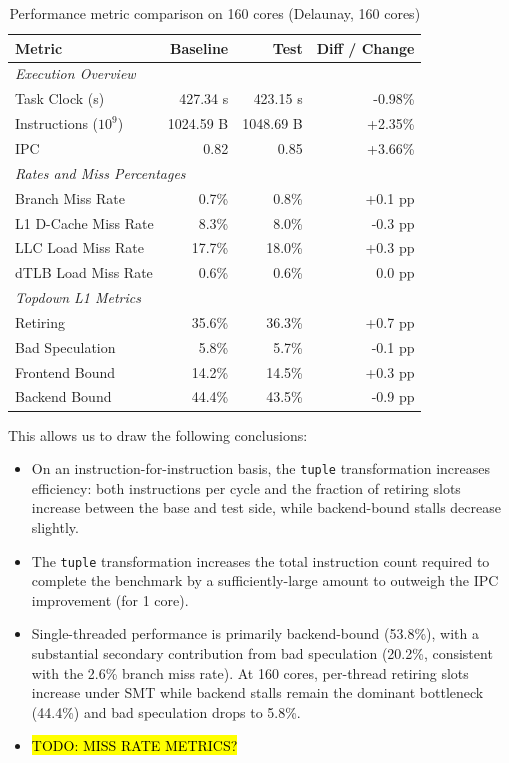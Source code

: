 \begin{table}[htbp]
  \centering
  \caption{Performance metric comparison on 160 cores (Delaunay, 160 cores)}
  \label{tab:perf_comparison_delaunay_160cores}
  \begin{tabular}{lrrr}
    \toprule
    \textbf{Metric} & \textbf{Baseline} & \textbf{Test} & \textbf{Diff / Change} \\
    \midrule
    \multicolumn{4}{l}{\textit{Execution Overview}} \\
    \quad Task Clock (s)           & 427.34 s   & 423.15 s   & -0.98\%   \\
    \quad Instructions ($10^9$)    & 1024.59 B  & 1048.69 B  & +2.35\%   \\
    \quad IPC                      & 0.82       & 0.85       & +3.66\%   \\
    \midrule
    \multicolumn{4}{l}{\textit{Rates and Miss Percentages}} \\
    \quad Branch Miss Rate         & 0.7\%      & 0.8\%      & +0.1 pp   \\
    \quad L1 D-Cache Miss Rate     & 8.3\%      & 8.0\%      & -0.3 pp   \\
    \quad LLC Load Miss Rate       & 17.7\%     & 18.0\%     & +0.3 pp   \\
    \quad dTLB Load Miss Rate      & 0.6\%      & 0.6\%      & 0.0 pp    \\
    \midrule
    \multicolumn{4}{l}{\textit{Topdown L1 Metrics}} \\
    \quad Retiring                 & 35.6\%     & 36.3\%     & +0.7 pp   \\
    \quad Bad Speculation          & 5.8\%     & 5.7\%     & -0.1 pp   \\
    \quad Frontend Bound           & 14.2\%     & 14.5\%     & +0.3 pp   \\
    \quad Backend Bound            & 44.4\%     & 43.5\%     & -0.9 pp   \\
    \bottomrule
  \end{tabular}
\end{table}
This allows us to draw the following conclusions:
\begin{itemize}
\item On an instruction-for-instruction basis, the \texttt{tuple} transformation
  increases efficiency: both instructions per cycle and the fraction of retiring
  slots increase between the base and test side, while backend-bound stalls
  decrease slightly.
\item The \texttt{tuple} transformation increases the total instruction count
  required to complete the benchmark by a sufficiently-large amount to outweigh
  the IPC improvement (for 1 core).
\item Single-threaded performance is primarily backend-bound (53.8\%), with a
  substantial secondary contribution from bad speculation (20.2\%, consistent
  with the 2.6\% branch miss rate). At 160 cores, per-thread retiring slots
  increase under SMT while backend stalls remain the dominant bottleneck (44.4\%)
  and bad speculation drops to 5.8\%.
\item \hl{TODO: MISS RATE METRICS?}
\end{itemize}

